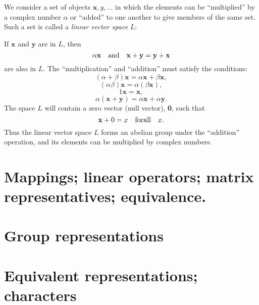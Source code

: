 \documentclass{book}
\begin{document}
\def\bx{\mathbf x}
\def\by{\mathbf y}

We consider a set of objects ${\mathbf x,y,...}$ in which the elements
can be ``multiplied'' by a complex number $\alpha$ or ``added'' to one
another to give members of the same set. Such a set is called a {\it
  linear vector space} $L$:

If $\bx$ and $\by$ are in $L$, then
$$
\alpha{\mathbf x} \quad {\rm and} \quad {\bx+\by = \by+\bx}
$$
are also in $L$. The ``multiplication'' and ``addition'' must satisfy the conditions:
$$(\alpha + \beta)\bx = \alpha\bx + \beta\bx,$$
$$(\alpha\beta)\bx = \alpha(\beta\bx),$$
$$1\bx = \bx,$$
$$\alpha(\bx+\by) = \alpha\bx + \alpha\by.$$
The space $L$ will contain a zero vector (null vector), {\bf 0}, such that
$$\mathbf x + 0 = x \quad {\rm for all} \quad x.$$
Thus the linear vector space $L$ forms an abelian group under the
``addition'' operation, and its elements can be multiplied by complex numbers.

\section{}
\section{}
\section{Mappings; linear operators; matrix representatives; equivalence.}
\section{Group representations}
\section{Equivalent representations; characters}
\end{document}
